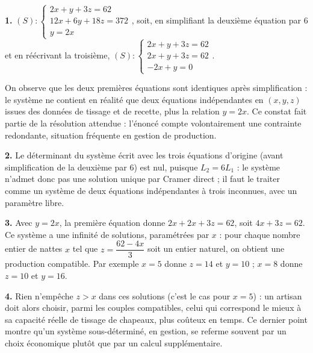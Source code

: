 \begin{corrige}
\textbf{1.}
$(S) : \begin{cases} 2x+y+3z = 62 \\ 12x+6y+18z = 372 \\ y=2x \end{cases}$,
soit, en simplifiant la deuxième équation par $6$ et en réécrivant la
troisième,
$(S) : \begin{cases} 2x+y+3z = 62 \\ 2x+y+3z = 62 \\ -2x+y = 0 \end{cases}$.

On observe que les deux premières équations sont identiques après
simplification : le système ne contient en réalité que deux équations
indépendantes en $(x,y,z)$ issues des données de tissage et de recette, plus
la relation $y=2x$. Ce constat fait partie de la résolution attendue :
l'énoncé compte volontairement une contrainte redondante, situation
fréquente en gestion de production.

\textbf{2.} Le déterminant du système écrit avec les trois équations
d'origine (avant simplification de la deuxième par $6$) est nul, puisque
$L_{2} = 6L_{1}$ : le système n'admet donc pas une solution unique par
Cramer direct ; il faut le traiter comme un système de deux équations
indépendantes à trois inconnues, avec un paramètre libre.

\textbf{3.} Avec $y=2x$, la première équation donne $2x+2x+3z=62$, soit
$4x+3z=62$. Ce système a une infinité de solutions, paramétrées par $x$ :
pour chaque nombre entier de nattes $x$ tel que $z = \dfrac{62-4x}{3}$ soit un
entier naturel, on obtient une production compatible. Par exemple $x=5$ donne
$z=14$ et $y=10$ ; $x=8$ donne $z=10$ et $y=16$.

\textbf{4.} Rien n'empêche $z>x$ dans ces solutions (c'est le cas pour
$x=5$) : un artisan doit alors choisir, parmi les couples compatibles, celui
qui correspond le mieux à sa capacité réelle de tissage de chapeaux, plus
coûteux en temps. Ce dernier point montre qu'un système sous-déterminé, en
gestion, se referme souvent par un choix économique plutôt que par un calcul
supplémentaire.
\end{corrige}

